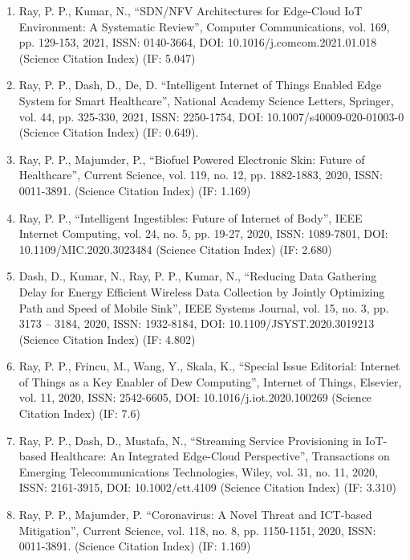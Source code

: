 \documentclass[11pt,a4paper]{moderncv}
\begin{document}
\begin{adjustwidth}{6em}{0pt}
\begin{enumerate}
		\item Ray, P. P., Kumar, N., “SDN/NFV Architectures for Edge-Cloud IoT Environment: A Systematic Review”, Computer Communications, vol. 169, pp. 129-153, 2021, ISSN: 0140-3664, DOI: 10.1016/j.comcom.2021.01.018 (Science Citation Index) (IF: 5.047)
		
		\item Ray, P. P., Dash, D., De, D. “Intelligent Internet of Things Enabled Edge System for Smart Healthcare”, National Academy Science Letters, Springer, vol. 44, pp. 325-330, 2021, ISSN: 2250-1754, DOI: 10.1007/s40009-020-01003-0 (Science Citation Index) (IF: 0.649).
		
		\item 	Ray, P. P., Majumder, P., “Biofuel Powered Electronic Skin: Future of Healthcare”, Current Science, vol. 119, no. 12, pp. 1882-1883, 2020, ISSN: 0011-3891. (Science Citation Index) (IF: 1.169) 
		
		\item Ray, P. P., “Intelligent Ingestibles: Future of Internet of Body”, IEEE Internet Computing, vol. 24, no. 5, pp. 19-27, 2020, ISSN: 1089-7801, DOI: 10.1109/MIC.2020.3023484 (Science Citation Index) (IF: 2.680) 
		
		\item Dash, D., Kumar, N., Ray, P. P., Kumar, N., “Reducing Data Gathering Delay for Energy Efficient Wireless Data Collection by Jointly Optimizing Path and Speed of Mobile Sink”, IEEE Systems Journal, vol. 15, no. 3, pp. 3173 – 3184, 2020, ISSN: 1932-8184, DOI: 10.1109/JSYST.2020.3019213 (Science Citation Index) (IF: 4.802)
		
		\item Ray, P. P., Frincu, M., Wang, Y., Skala, K., “Special Issue Editorial: Internet of Things as a Key Enabler of Dew Computing”, Internet of Things, Elsevier, vol. 11, 2020, ISSN: 2542-6605, DOI: 10.1016/j.iot.2020.100269 (Science Citation Index) (IF: 7.6)
		
		\item Ray, P. P., Dash, D., Mustafa, N., “Streaming Service Provisioning in IoT-based Healthcare: An Integrated Edge-Cloud Perspective”, Transactions on Emerging Telecommunications Technologies, Wiley, vol. 31, no. 11, 2020, ISSN: 2161-3915, DOI: 10.1002/ett.4109 (Science Citation Index) (IF: 3.310) 
		
		\item Ray, P. P., Majumder, P. “Coronavirus: A Novel Threat and ICT-based Mitigation”, Current Science, vol. 118, no. 8, pp. 1150-1151, 2020, ISSN: 0011-3891. (Science Citation Index) (IF: 1.169)
		

\end{enumerate}
\end{adjustwidth}
\end{document}
